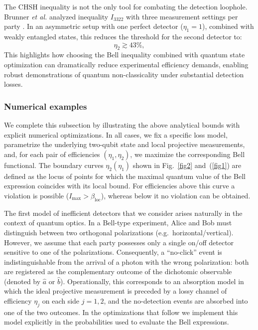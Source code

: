 \documentclass[aps,pra,reprint, superscriptaddress,showkeys]{revtex4-2}
\theoremstyle{plain}
\begin{document}
The CHSH inequality is not the only tool for combating the detection loophole. Brunner \textit{et al.} analyzed inequality $I_{3322}$ with three measurement settings per party \cite{BrunnerI3322}. In an asymmetric setup with one perfect detector ($\eta_1 = 1$), combined with weakly entangled states, this reduces the threshold for the second detector to:
\begin{equation}
\eta_2 \gtrsim 43\%,
\end{equation}
This highlights how choosing the Bell inequality combined with quantum state optimization can dramatically reduce experimental efficiency demands, enabling robust demonstrations of quantum non-classicality under substantial detection losses.



\subsubsection{Numerical examples}

We complete this subsection by illustrating the above analytical bounds
with explicit numerical optimizations. In all cases, we fix a specific
loss model, parametrize the underlying two-qubit state and local
projective measurements, and, for each pair of efficiencies
$(\eta_1,\eta_2)$, we maximize the corresponding Bell functional. The boundary curves $\eta_2(\eta_1)$ shown in Fig.~\ref{fig2} and~(\ref{fig1}) are defined
as the locus of points for which the maximal quantum value of the Bell
expression coincides with its local bound. For efficiencies above this
curve a violation is possible ($I_{\max} > \beta_{\mathrm{loc}}$), whereas
below it no violation can be obtained.


The first model of inefficient detectors that we consider arises
naturally in the context of quantum optics. In a Bell-type experiment,
Alice and Bob must distinguish between two orthogonal polarizations
(e.g.\ horizontal/vertical). However, we assume that each party
possesses only a single on/off detector sensitive to one of the
polarizations. Consequently, a ``no-click'' event is indistinguishable
from the arrival of a photon with the wrong polarization: both are
registered as the complementary outcome of the dichotomic observable
(denoted by $\hat a$ or $\hat b$). Operationally, this corresponds to
an absorption model in which the ideal projective measurement is
preceded by a lossy channel of efficiency $\eta_j$ on each side $j=1,2$,
and the no-detection events are absorbed into one of the two outcomes.
In the optimizations that follow we implement this model explicitly in
the probabilities used to evaluate the Bell expressions.
\end{document}
